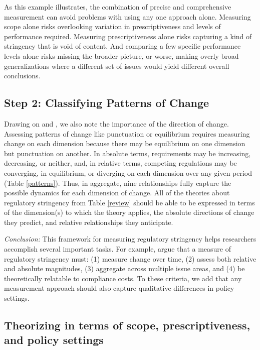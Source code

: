 \documentclass[
      12pt,
            Review ]{article}
\begin{document}
As this example illustrates, the combination of precise and
comprehensive measurement can avoid problems with using any one approach
alone. Measuring scope alone risks overlooking variation in
prescriptiveness and levels of performance required. Measuring
prescriptiveness alone risks capturing a kind of stringency that is void
of content. And comparing a few specific performance levels alone risks
missing the broader picture, or worse, making overly broad
generalizations where a different set of issues would yield different
overall conclusions.

\subsection{Step 2: Classifying Patterns of
Change}\label{step-2-classifying-patterns-of-change}

Drawing on \citet{Baumgartner2002} and \citet{Howlett2007}, we also note
the importance of the direction of change. Assessing patterns of change
like punctuation or equilibrium requires measuring change on each
dimension because there may be equilibrium on one dimension but
punctuation on another. In absolute terms, requirements may be
increasing, decreasing, or neither, and, in relative terms, competing
regulations may be converging, in equilibrium, or diverging on each
dimension over any given period (Table \ref{patterns}). Thus, in
aggregate, nine relationships fully capture the possible dynamics for
each dimension of change. All of the theories about regulatory
stringency from Table \ref{review} should be able to be expressed in
terms of the dimension(s) to which the theory applies, the absolute
directions of change they predict, and relative relationships they
anticipate.



\emph{Conclusion:} This framework for measuring regulatory stringency
helps researchers accomplish several important tasks. For example,
\citet{Brunel2016} argue that a measure of regulatory stringency must:
(1) measure change over time, (2) assess both relative and absolute
magnitudes, (3) aggregate across multiple issue areas, and (4) be
theoretically relatable to compliance costs. To these criteria, we add
that any measurement approach should also capture qualitative
differences in policy settings.

\subsection{Theorizing in terms of scope, prescriptiveness, and policy
settings}\label{theorizing-in-terms-of-scope-prescriptiveness-and-policy-settings}
\end{document}
